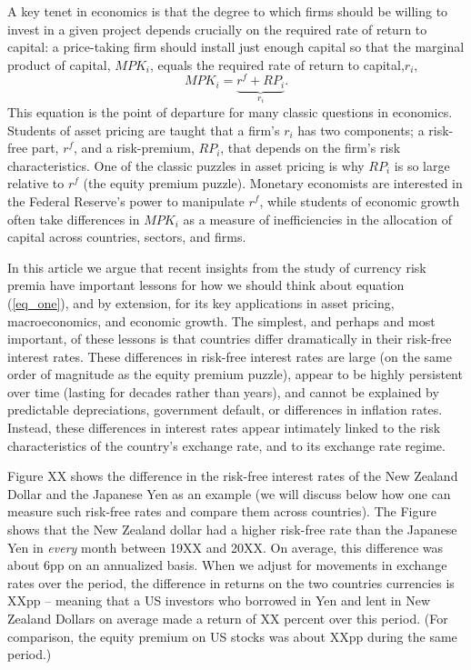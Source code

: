 \documentclass[12pt,letter]{article}
\theoremstyle{break} \theorembodyfont{\normalfont\itshape}
\theoremstyle{break}
\theoremstyle{break} \theorembodyfont{\normalfont\itshape}
\theoremstyle{break} \theorembodyfont{\normalfont\itshape}
\begin{document}
A key tenet in economics is that the degree to which firms should be
willing to invest in a given project depends crucially on the required
rate of return to capital: a price-taking firm should install just
enough capital so that the marginal product of capital, $MPK_i$, equals
the required rate of return to capital,$r_i$, 
\begin{equation}
    MPK_i=\underbrace{r^f+RP_i}_{r_i}.
    \label{eq_one}
\end{equation} 
This equation is the point of departure for many classic questions in economics. Students of asset
pricing are taught that a firm's $r_i$ has two components; a risk-free
part, $r^f$, and a risk-premium, $RP_i$, that depends on the firm's
risk characteristics. One of the classic puzzles in asset pricing is
why $RP_i$ is so large relative to $r^f$ (the equity premium puzzle).
Monetary economists are interested in the Federal Reserve's power to
manipulate $r^f$, while students of economic growth often take
differences in $MPK_i$ as a measure of inefficiencies in the
allocation of capital across countries, sectors, and firms.

In this article we argue that recent insights from the study of
currency risk premia have important lessons for how we should think
about equation (\ref{eq_one}), and by extension, for its key
applications in asset pricing, macroeconomics, and economic growth.
The simplest, and perhaps and most important, of these lessons is that
countries differ dramatically in their risk-free interest rates. These
differences in risk-free interest rates are large (on the same order
of magnitude as the equity premium puzzle), appear to be highly
persistent over time (lasting for decades rather than years), and
cannot be explained by predictable depreciations, government default,
or differences in inflation rates. Instead, these differences in
interest rates appear intimately linked to the risk characteristics of
the country's exchange rate, and to its exchange rate regime.

Figure XX shows the difference in the risk-free interest rates of the
New Zealand Dollar and the Japanese Yen as an example (we will discuss
below how one can measure such risk-free rates and compare them across
countries). The Figure shows that the New Zealand dollar had a higher
risk-free rate than the Japanese Yen in \textit{every} month between
19XX and 20XX. On average, this difference was about 6pp on an
annualized basis. When we adjust for movements in exchange rates over
the period, the difference in returns on the two countries currencies
is XXpp -- meaning that a US investors who borrowed in Yen and lent in
New Zealand Dollars on average made a return of XX percent over this
period. (For comparison, the equity premium on US stocks was about
XXpp during the same period.)
\end{document}
